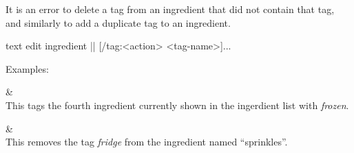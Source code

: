 	It is an error to delete a tag from an ingredient that did not contain that tag, and similarly to add a duplicate tag to an ingredient.

	 \begin{blockofcode}{text}
		edit ingredient |\itemref{}|
			[/tag:<action> <tag-name>]...
	\end{blockofcode}

	Examples:
	\begin{bulletlist}
		&  \\
		  This tags the fourth ingredient currently shown in the ingerdient list with \emph{frozen}.

		&  \\
		  This removes the tag \emph{fridge} from the ingredient named \enquote{sprinkles}.
	\end{bulletlist}












